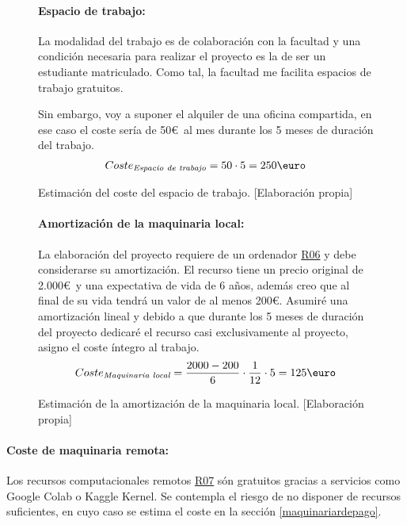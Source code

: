 \begin{figure}[ht]
    \paragraph{Espacio de trabajo:}
    La modalidad del trabajo es de colaboración con la facultad y una condición necesaria para realizar el proyecto
    es la de ser un estudiante matriculado. Como tal, la facultad me facilita espacios de trabajo gratuitos.
    
    Sin embargo, voy a suponer el alquiler de una oficina compartida, en ese caso el coste sería de 50\euro\
    al mes durante los 5 meses de duración del trabajo.
    \begin{align*}
        Coste_{\textit{Espacio de trabajo}} = 50 \cdot 5 = 250\text{\euro}
    \end{align*}
    \caption{Estimación del coste del espacio de trabajo.  [Elaboración propia]}
\end{figure}

\begin{figure}[H]
\paragraph{Amortización de la maquinaria local:}
La elaboración del proyecto requiere de un ordenador \hyperref[R06]{R06} y debe considerarse su 
amortización.
El recurso tiene un precio original de 2.000\euro\ y una expectativa de vida de 6 años, además creo que al final
de su vida tendrá un valor de al menos 200\euro. Asumiré una amortización lineal y debido a que durante los 5 meses
de duración del proyecto dedicaré el recurso casi exclusivamente al proyecto, asigno el coste íntegro al trabajo.
    \begin{align*}
        Coste_{\textit{Maquinaria local}} = \frac{2000-200}{6} \cdot \frac{1}{12} \cdot 5 = 125\text{\euro}
    \end{align*}
    \caption{Estimación de la amortización de la maquinaria local.  [Elaboración propia]}
\end{figure}

\paragraph{Coste de maquinaria remota:}
Los recursos computacionales remotos \hyperref[R07]{R07} són gratuitos gracias a servicios como
Google Colab o Kaggle Kernel.
Se contempla el riesgo de no disponer de recursos suficientes, en cuyo caso se estima el coste en
la sección \ref{maquinariardepago}.


